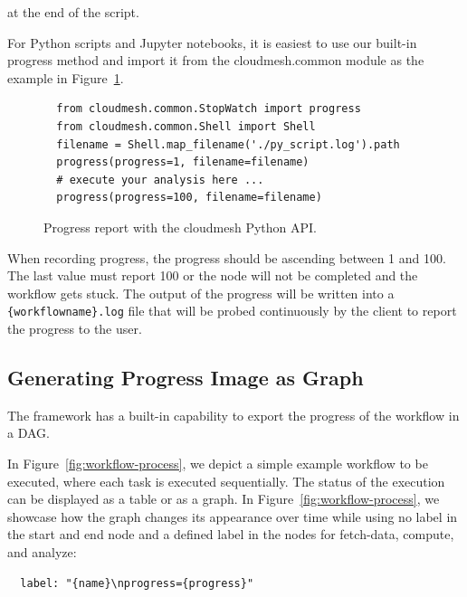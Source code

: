 \documentclass[sigplan,screen]{acmart}
\begin{document}
at the end of the script.

For Python scripts and Jupyter notebooks, it is easiest to use our
built-in progress method and import it from the cloudmesh.common
module as the example in Figure~\ref{fig:py-progress}. 

\begin{figure}[htb]

{\scriptsize
\begin{verbatim}
  from cloudmesh.common.StopWatch import progress
  from cloudmesh.common.Shell import Shell
  filename = Shell.map_filename('./py_script.log').path
  progress(progress=1, filename=filename)
  # execute your analysis here ...
  progress(progress=100, filename=filename)
\end{verbatim}}
\caption{Progress report with the cloudmesh Python API.}
\label{fig:py-progress}

\end{figure}


When recording progress, the progress should be ascending between 1
and 100. The last value must report 100 or the node will not be
completed and the workflow gets stuck. The output of the progress will
be written into a {\scriptsize \verb|{workflowname}.log|} file that
will be probed continuously by the client to report the progress to
the user.

\subsection{Generating Progress Image as Graph}

The framework has a built-in capability to export the progress of the
workflow in a DAG.

In Figure~\ref{fig:workflow-process}, we depict a simple example
workflow to be executed, where each task is executed sequentially. The
status of the execution can be displayed as a table or as a graph. In
Figure~\ref{fig:workflow-process}, we showcase how the graph changes
its appearance over time while using no label in the start and end
node and a defined label in the nodes for fetch-data, compute, and
analyze:

{\scriptsize
\begin{verbatim}
  label: "{name}\nprogress={progress}"
\end{verbatim}
}
\end{document}
